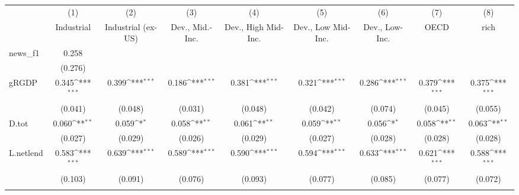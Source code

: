 {
\def\sym#1{\ifmmode^{#1}\else\(^{#1}\)\fi}
\begin{tabular}{l*{8}{c}}
\toprule
            &\multicolumn{1}{c}{(1)}&\multicolumn{1}{c}{(2)}&\multicolumn{1}{c}{(3)}&\multicolumn{1}{c}{(4)}&\multicolumn{1}{c}{(5)}&\multicolumn{1}{c}{(6)}&\multicolumn{1}{c}{(7)}&\multicolumn{1}{c}{(8)}\\
            &\multicolumn{1}{c}{Industrial}&\multicolumn{1}{c}{Industrial (ex-US)}&\multicolumn{1}{c}{Dev., Mid.-Inc.}&\multicolumn{1}{c}{Dev., High Mid-Inc.}&\multicolumn{1}{c}{Dev., Low Mid-Inc.}&\multicolumn{1}{c}{Dev., Low-Inc.}&\multicolumn{1}{c}{OECD}&\multicolumn{1}{c}{rich}\\
\midrule
news\_f1     &       0.258         &                     &                     &                     &                     &                     &                     &                     \\
            &     (0.276)         &                     &                     &                     &                     &                     &                     &                     \\
\addlinespace
gRGDP       &       0.345\sym{***}&       0.399\sym{***}&       0.186\sym{***}&       0.381\sym{***}&       0.321\sym{***}&       0.286\sym{***}&       0.379\sym{***}&       0.375\sym{***}\\
            &     (0.041)         &     (0.048)         &     (0.031)         &     (0.048)         &     (0.042)         &     (0.074)         &     (0.045)         &     (0.055)         \\
\addlinespace
D.tot       &       0.060\sym{**} &       0.059\sym{*}  &       0.058\sym{**} &       0.061\sym{**} &       0.059\sym{**} &       0.056\sym{*}  &       0.058\sym{**} &       0.063\sym{**} \\
            &     (0.027)         &     (0.029)         &     (0.026)         &     (0.029)         &     (0.027)         &     (0.028)         &     (0.028)         &     (0.028)         \\
\addlinespace
L.netlend   &       0.583\sym{***}&       0.639\sym{***}&       0.589\sym{***}&       0.590\sym{***}&       0.594\sym{***}&       0.633\sym{***}&       0.621\sym{***}&       0.588\sym{***}\\
            &     (0.103)         &     (0.091)         &     (0.076)         &     (0.093)         &     (0.077)         &     (0.085)         &     (0.077)         &     (0.072)         \\
\addlinespace

\end{tabular}}
